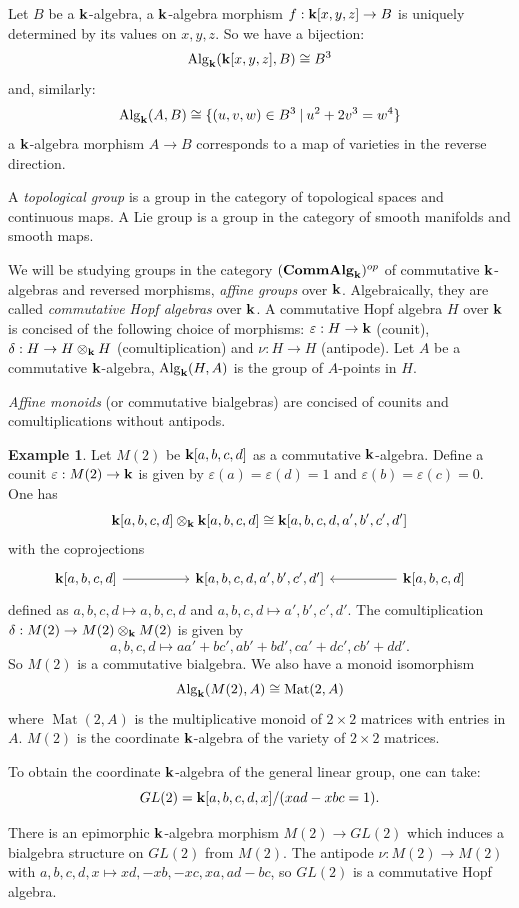 \documentclass[8pt]{article}
\theoremstyle{definition}
\theoremstyle{definition}
\theoremstyle{definition}
\theoremstyle{definition}
\theoremstyle{definition}
\theoremstyle{definition}
\theoremstyle{definition}
\theoremstyle{definition}
\theoremstyle{definition}
\theoremstyle{definition}
\theoremstyle{definition}
\theoremstyle{definition}
\newtheorem{example}{Example}[section]
\theoremstyle{definition}
\theoremstyle{definition}
\theoremstyle{question}
\begin{document}
Let $B$ be a ${\bf k}$-algebra, a ${\bf k}$-algebra morphism 
$f : {\bf k}[x, y,z] \to B$ is uniquely determined by its values on $x,y,z$. So we have a bijection:
\[
\operatorname{Alg}_{\bf k}({\bf k}[x, y,z], B) \cong B^3
\]
and, similarly:
\[
\operatorname{Alg}_{\bf k}(A, B) \cong \{ (u,v,w) \in B^3 \: | \: u^2 + 2v^3 = w^4 \}
\]
a ${\bf k}$-algebra morphism $A \to B$ corresponds to a map of varieties in the reverse direction.

\vspace{\baselineskip}

A \emph{topological group} is a group in the category of topological spaces and continuous maps.
A Lie group is a group in the category of smooth manifolds and smooth maps.

We will be studying groups in the category $({\bf CommAlg}_{\bf k})^{op}$
of commutative ${\bf k}$-algebras and reversed morphisms, \emph{affine groups} over
${\bf k}$. Algebraically, they are called \emph{commutative Hopf algebras} over ${\bf k}$.
A commutative Hopf algebra $H$ over ${\bf k}$ is concised of the following choice of morphisms:
$\varepsilon : H \to {\bf k}$ (counit), $\delta : H \to H \otimes_{\bf k} H$ (comultiplication)
and $\nu : H \to H$ (antipode). Let $A$ be a commutative ${\bf k}$-algebra,
$\operatorname{Alg}_{\bf k}(H, A)$ is the group of $A$-points in $H$.

\emph{Affine monoids} (or commutative bialgebras) are concised of counits and comultiplications
without antipods.

\begin{example}
  Let $M(2)$ be ${\bf k}[a,b,c,d]$ as a commutative ${\bf k}$-algebra.
  Define a counit $\varepsilon : M(2) \to {\bf k}$ is given by 
  $\varepsilon(a) = \varepsilon(d) = 1$ and $\varepsilon(b) = \varepsilon(c) = 0$.
  One has
  \[
  {\bf k}[a, b, c, d] \otimes_{\bf k} {\bf k}[a, b, c, d] \cong {\bf k}[a, b, c, d, a', b', c', d']
  \]
  with the coprojections
  \[
  \begin{tikzcd}
    {\bf k}[a, b, c, d] \ar[rr] && {\bf k}[a, b, c, d, a', b', c', d'] && {\bf k}[a, b, c, d] \ar[ll]
  \end{tikzcd}
  \]
  defined as $a,b,c,d \mapsto a,b,c,d$ and $a,b,c,d \mapsto a',b',c',d'$.
  The comultiplication $\delta : M(2) \to M(2) \otimes_{\bf k} M(2)$ is given by
  \[
  a,b,c,d \mapsto a a' + b c', a b' + bd', c a' + dc', cb' + dd'.
  \]
  So $M(2)$ is a commutative bialgebra. We also have a monoid isomorphism
  \[
  \operatorname{Alg}_{\bf k}(M(2), A) \cong \operatorname{Mat}(2, A)
  \]
  where $\operatorname{Mat}(2, A)$ is the multiplicative monoid of $2 \times 2$ matrices
  with entries in $A$. $M(2)$ is the coordinate ${\bf k}$-algebra of the variety of $2 \times 2$ matrices.

  To obtain the coordinate ${\bf k}$-algebra of the general linear group, one can take:
  \[
  GL(2) = {\bf k}[a,b,c,d,x] / (x a d - x b c = 1).
  \]

  There is an epimorphic ${\bf k}$-algebra morphism $M(2) \to GL(2)$
  which induces a bialgebra structure on $GL(2)$ from $M(2)$.
  The antipode $\nu : M(2) \to M(2)$ with $a,b,c,d,x \mapsto xd, -xb, -xc, xa, ad - bc$,
  so $GL(2)$ is a commutative Hopf algebra.
\end{example}
\end{document}
